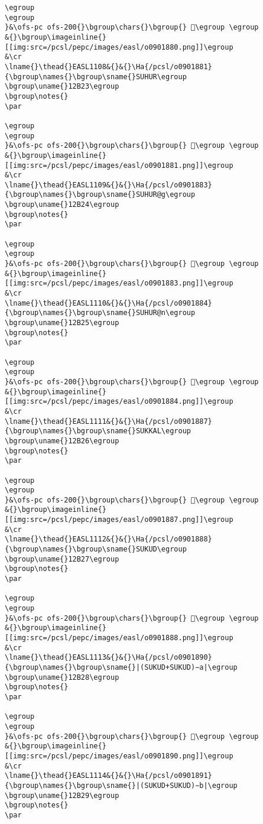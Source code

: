 \begin{verbatim}
\egroup
\egroup
}&\ofs-pc ofs-200{}\bgroup\chars{}\bgroup{} 𒬢\egroup \egroup
&{}\bgroup\imageinline{}[[img:src=/pcsl/pepc/images/easl/o0901880.png]]\egroup
&\cr
\lname{}\thead{}EASL1108&{}&{}\Ha{/pcsl/o0901881}{\bgroup\names{}\bgroup\sname{}SUHUR\egroup
\bgroup\uname{}12B23\egroup
\bgroup\notes{}
\par 

\egroup
\egroup
}&\ofs-pc ofs-200{}\bgroup\chars{}\bgroup{} 𒬣\egroup \egroup
&{}\bgroup\imageinline{}[[img:src=/pcsl/pepc/images/easl/o0901881.png]]\egroup
&\cr
\lname{}\thead{}EASL1109&{}&{}\Ha{/pcsl/o0901883}{\bgroup\names{}\bgroup\sname{}SUHUR@g\egroup
\bgroup\uname{}12B24\egroup
\bgroup\notes{}
\par 

\egroup
\egroup
}&\ofs-pc ofs-200{}\bgroup\chars{}\bgroup{} 𒬤\egroup \egroup
&{}\bgroup\imageinline{}[[img:src=/pcsl/pepc/images/easl/o0901883.png]]\egroup
&\cr
\lname{}\thead{}EASL1110&{}&{}\Ha{/pcsl/o0901884}{\bgroup\names{}\bgroup\sname{}SUHUR@n\egroup
\bgroup\uname{}12B25\egroup
\bgroup\notes{}
\par 

\egroup
\egroup
}&\ofs-pc ofs-200{}\bgroup\chars{}\bgroup{} 𒬥\egroup \egroup
&{}\bgroup\imageinline{}[[img:src=/pcsl/pepc/images/easl/o0901884.png]]\egroup
&\cr
\lname{}\thead{}EASL1111&{}&{}\Ha{/pcsl/o0901887}{\bgroup\names{}\bgroup\sname{}SUKKAL\egroup
\bgroup\uname{}12B26\egroup
\bgroup\notes{}
\par 

\egroup
\egroup
}&\ofs-pc ofs-200{}\bgroup\chars{}\bgroup{} 𒬦\egroup \egroup
&{}\bgroup\imageinline{}[[img:src=/pcsl/pepc/images/easl/o0901887.png]]\egroup
&\cr
\lname{}\thead{}EASL1112&{}&{}\Ha{/pcsl/o0901888}{\bgroup\names{}\bgroup\sname{}SUKUD\egroup
\bgroup\uname{}12B27\egroup
\bgroup\notes{}
\par 

\egroup
\egroup
}&\ofs-pc ofs-200{}\bgroup\chars{}\bgroup{} 𒬧\egroup \egroup
&{}\bgroup\imageinline{}[[img:src=/pcsl/pepc/images/easl/o0901888.png]]\egroup
&\cr
\lname{}\thead{}EASL1113&{}&{}\Ha{/pcsl/o0901890}{\bgroup\names{}\bgroup\sname{}|(SUKUD+SUKUD)∼a|\egroup
\bgroup\uname{}12B28\egroup
\bgroup\notes{}
\par 

\egroup
\egroup
}&\ofs-pc ofs-200{}\bgroup\chars{}\bgroup{} 𒬨\egroup \egroup
&{}\bgroup\imageinline{}[[img:src=/pcsl/pepc/images/easl/o0901890.png]]\egroup
&\cr
\lname{}\thead{}EASL1114&{}&{}\Ha{/pcsl/o0901891}{\bgroup\names{}\bgroup\sname{}|(SUKUD+SUKUD)∼b|\egroup
\bgroup\uname{}12B29\egroup
\bgroup\notes{}
\par 


\end{verbatim}
